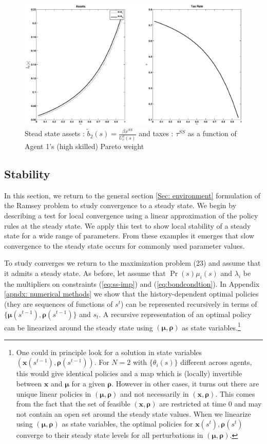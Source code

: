 \documentclass[thmsb,11pt]{article}
\begin{document}
  \begin{figure}[htp]
 \centering
 \includegraphics[width=\textwidth]{Draft25Graphs/SS_alpha1.eps}
 \caption{ Stead state assets : $\tilde{b}_2(s)=\frac{\beta  x^{SS}}{U^2_c(s)}$ and taxes : $\tau^{SS}$ as a function of Agent 1's (high skilled) Pareto weight}
 \label{fig: SS comparative}
 \end{figure}


\subsection{Stability}
In this section, we return to the general section \ref{Sec: environment} formulation of the Ramsey problem  to study convergence to a steady state. We begin by describing a test for local convergence using a linear approximation of the policy rules at the steady state. We apply this test to show local stability of a steady state for a wide range of parameters. From these examples it emerges that slow convergence to the steady state occurs for  commonly used parameter values.

To study converges we return to the maximization problem (23) and assume that it admits a steady state. As before, let assume that $\Pr(s)\mu_i(s)$ and $\lambda_i$ be the multipliers on constraints (\ref{eq:ss-imp}) and (\ref{eq:bondcondtion}). In Appendix \ref{apndx: numerical methods} we show that the history-dependent optimal policies (they are sequences of functions of $s^t$) can be represented  recursively in terms of $\{\bm \mu(s^{t-1}),\bm \rho(s^{t-1})\}$ and $s_t$. A recursive representation of an optimal policy can be linearized around the steady state using $(\bm{\mu},\bm{\rho})$ as state variables.\footnote{One could  in principle look for a solution in state variables $\left(\bm{x}(s^{t-1}),\bm{\rho}(s^{t-1})\right)$. For $N=2$ with $\{\theta_i(s)\}$ different across agents, this would give identical policies and a map which is (locally) invertible between $\bm{x}$ and $\bm{\mu}$ for a given $\bm{\rho}$. However in other cases, it turns out there are unique linear policies in $(\bm{\mu},\bm{\rho})$ and not necessarily in  $(\bm{x},\bm{\rho})$. This comes from the fact that the set of feasible $(\bm{x},\bm{\rho})$ are restricted at time 0 and may not contain an open set around the steady state values. When we linearize using $(\bm{\mu},\bm{\rho})$ as state variables, the optimal policies for $\bm{x}(s^t),\bm{\rho}(s^t)$ converge to their  steady state levels for all perturbations in $(\bm{\mu},\bm{\rho})$.}
\end{document}
